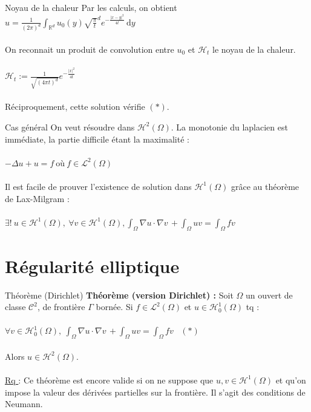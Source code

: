 \documentclass[10pt]{beamer}
\begin{document}
\begin{frame}{Noyau de la chaleur}
Par les calculs, on obtient $u=\frac{1}{(2\pi)^d}  \displaystyle \int_{\mathbb{R}^d} u_0(y)\sqrt{\frac{\pi}{t}}^d e^{-\frac{|x-y|^2}{4t}} \, \mathrm{d}y $\\ ~ \\ 
On reconnait un produit de convolution entre $u_0$ et $\mathcal{H}_t$ le noyau de la chaleur. \\ ~ \\ 

$\mathcal{H}_t := \frac{1}{\sqrt{(4\pi t)^d}} e^{-\frac{|x|^2}{4t}}$ \\ ~ \\ 

Réciproquement, cette solution vérifie $(*)$.
\end{frame}


\begin{frame}{Cas général}
On veut résoudre dans $\mathcal{H}^2(\Omega)$. La monotonie du laplacien est immédiate, la partie difficile étant la maximalité : \\ ~ \\ 
$-\Delta u +u = f \ \text{où} \ f \in \mathcal{L}^2(\Omega) $   \\ ~ \\ 
Il est facile de prouver l'existence de solution dans $\mathcal{H}^1(\Omega)$ grâce au théorème de Lax-Milgram :\\ ~ \\ 
$\exists !\  u\in\mathcal{H}^1(\Omega), \ \forall v \in \mathcal{H}^1(\Omega), \displaystyle \int_{\Omega} \nabla u \cdot \nabla v \,  + \int_{\Omega} u v =  \int_{\Omega} f v  \, $
\end{frame}



\section{Régularité elliptique}

\begin{frame}{Théorème (Dirichlet)}
\textbf{Théorème (version Dirichlet) :} Soit $\Omega$ un ouvert de classe $\mathcal{C}^2$, de frontière $\Gamma$ bornée. Si $f \in \mathcal{L}^2(\Omega)$ et $u\in \mathcal{H}^1_0(\Omega)$ tq : \\ ~ \\  $\forall v \in \mathcal{H}^1_0(\Omega), \ \displaystyle \int_{\Omega} \nabla u \cdot \nabla v \,  + \int_{\Omega} u v =  \int_{\Omega} f v  \, \ \ \ (*) $\\ ~ \\ 
Alors $u\in \mathcal{H}^2(\Omega)$. \\~\\

\underline{Rq }: Ce théorème est encore valide si on ne suppose que $u,v\in\mathcal{H}^1(\Omega)$ et qu'on impose la valeur des dérivées partielles sur la frontière. Il s'agit des conditions de Neumann.
\end{frame}
\end{document}
